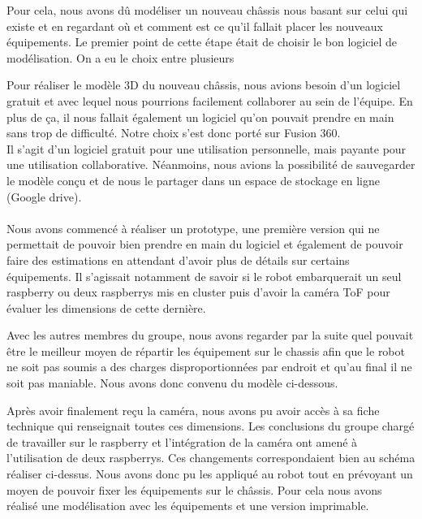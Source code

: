 
Pour cela, nous avons dû modéliser un nouveau châssis nous basant sur celui qui existe et en regardant où et comment est ce qu'il fallait placer les nouveaux équipements.
Le premier point de cette étape était de choisir le bon logiciel de modélisation. On a eu le choix entre plusieurs


Pour réaliser le modèle 3D du nouveau châssis, nous avions besoin d'un logiciel gratuit et avec lequel nous pourrions facilement collaborer au sein de l'équipe. En plus de ça, il nous fallait également un logiciel qu'on pouvait prendre en main sans trop de difficulté.
Notre choix s’est donc porté sur Fusion 360.\\

Il s'agit d'un logiciel gratuit pour une utilisation personnelle, mais payante pour une utilisation collaborative. Néanmoins, nous avions la possibilité de sauvegarder le modèle conçu et de nous le partager dans un espace de stockage en ligne (Google drive).\\
\\
Nous avons commencé à réaliser un prototype, une première version qui ne permettait de pouvoir bien prendre en main du logiciel et également de pouvoir faire des estimations en attendant d'avoir plus de détails sur certains équipements. Il s'agissait notamment de savoir si le robot embarquerait un seul raspberry ou deux raspberrys mis en cluster puis d'avoir la caméra ToF pour évaluer les dimensions de cette dernière.


Avec les autres membres du groupe, nous avons regarder par la suite quel pouvait être le meilleur moyen de répartir les équipement sur le chassis afin que le robot ne soit pas soumis a des charges disproportionnées par endroit et qu'au final il ne soit pas maniable. Nous avons donc convenu du modèle ci-dessous.



Après avoir finalement reçu la caméra, nous avons pu avoir accès à sa fiche technique qui renseignait toutes ces dimensions. Les conclusions du groupe chargé de travailler sur le raspberry et l'intégration de la caméra ont amené à l'utilisation de deux raspberrys. Ces changements correspondaient bien au schéma réaliser ci-dessus. Nous avons donc pu les appliqué au robot tout en prévoyant un moyen de pouvoir fixer les équipements sur le châssis. Pour cela nous avons réalisé une modélisation avec les équipements et une version imprimable.


